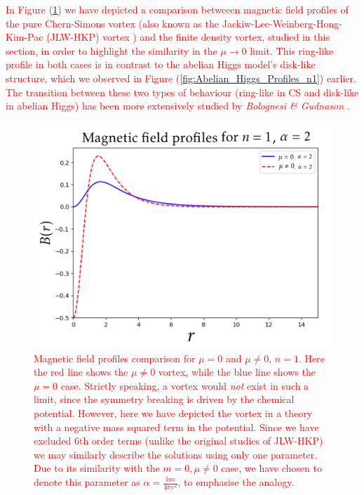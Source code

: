  \textcolor{red}{In Figure (\ref{Comparison}) we have depicted a comparison betweeen magnetic field profiles of the pure Chern-Simons vortex (also known as the Jackiw-Lee-Weinberg-Hong-Kim-Pac (JLW-HKP) vortex \cite{Hong1990, Jackiw:1990aw, Jackiw:1990pr}) and the finite density vortex, studied in this section, in order to highlight the similarity in the $\mu \rightarrow 0$ limit. This ring-like profile in both cases is in contrast to the abelian Higgs model's disk-like structure, which we observed in Figure (\ref{fig:Abelian_Higgs_Profiles_n1}) earlier. The transition between these two types of behaviour (ring-like in CS and disk-like in abelian Higgs) has been more extensively studied by \textit{Bolognesi \& Gudnason} \cite{Bolognesi:2007ez}. }


\begin{figure}[H]
\begin{center}
 \includegraphics[width=5in]{Chapter_2_Folder_1912.11321/figures/solution_JLW-HKP_n-1_Bvsalpha.png}
     \caption[Magnetic field profiles comparison for $\mu =0$ and $\mu \neq 0$, $n=1$.]{ \textcolor{red}{Magnetic field profiles comparison for $\mu =0$ and $\mu \neq 0$, $n=1$. Here the red line shows the $\mu \neq 0$ vortex, while the blue line shows the $\mu =0$ case. Strictly speaking, a vortex would \textit{not} exist in such a limit, since the symmetry breaking is driven by the chemical potential. However, here we have depicted the vortex in a theory with a negative mass squared term in the potential. Since we have excluded 6th order terms (unlike the original studies of JLW-HKP) we may similarly describe the solutions using only one parameter. Due to its similarity with the $m=0, \mu\neq 0$ case, we have chosen to denote this parameter as $\alpha= \frac{k m}{4\pi v^2}$, to emphasi\textcolor{red}{s}e the analogy.}} \label{Comparison}
    \end{center}
\end{figure}

